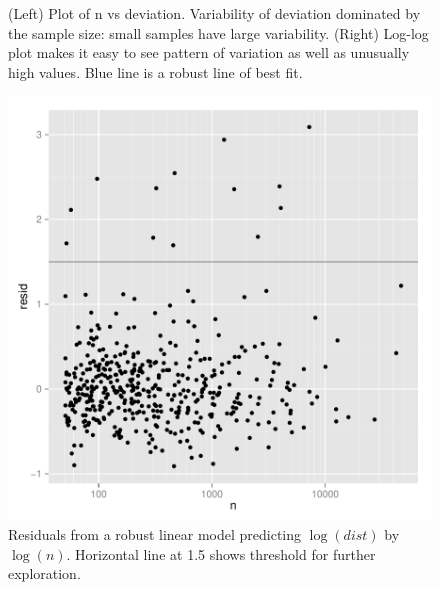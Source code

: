\documentclass[article]{jss}
\begin{document}
\begin{figure}[htbp]
  \centering

  \caption{(Left) Plot of n vs deviation. Variability of deviation dominated by the sample size: small samples have large variability. (Right) Log-log plot makes it easy to see pattern of variation as well as unusually high values.  Blue line is a robust line of best fit.}
  \label{fig:deviation}
\end{figure}

\begin{figure}[htbp]
  \centering
    \includegraphics[width=0.5\linewidth]{case-study/n-dist-resid}
  \caption{Residuals from a robust linear model predicting $\log(dist)$ by $\log(n)$. Horizontal line at 1.5 shows threshold for further exploration.}
  \label{fig:devi-resid}
\end{figure}
\end{document}
